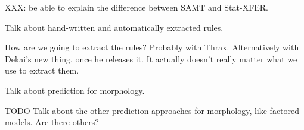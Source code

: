 XXX: be able to explain the difference between SAMT and Stat-XFER.

Talk about hand-written and automatically extracted rules.

How are we going to extract the rules? Probably with Thrax. Alternatively with
Dekai's new thing, once he releases it. It actually doesn't really matter what
we use to extract them.

Talk about prediction for morphology.
\cite{toutanova-suzuki-ruopp:2008:ACLMain}

TODO Talk about the other prediction approaches for morphology, like factored
models. Are there others?
